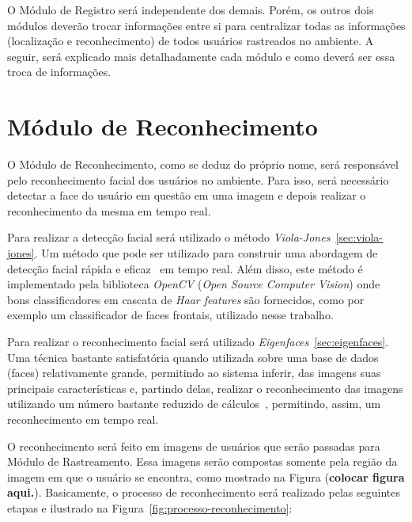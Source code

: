 
O Módulo de Registro será independente dos demais. Porém, os outros dois módulos deverão trocar informações entre si para centralizar todas as informações (localização e reconhecimento) de todos usuários rastreados no ambiente. A seguir, será explicado mais detalhadamente cada módulo e como deverá ser essa troca de informações.

\section{Módulo de Reconhecimento}

	O Módulo de Reconhecimento, como se deduz do próprio nome, será responsável pelo reconhecimento facial dos usuários no ambiente. Para isso, será necessário detectar a face do usuário em questão em uma imagem e depois realizar o reconhecimento da mesma em tempo real. 

	Para realizar a detecção facial será utilizado o método \textit{Viola-Jones}~\ref{sec:viola-jones}. Um método que pode ser utilizado para construir uma abordagem de detecção facial rápida e eficaz~\cite{violajones} em tempo real. Além disso, este método é implementado pela biblioteca \textit{OpenCV} (\textit{Open Source Computer Vision}) onde bons classificadores em cascata de \textit{Haar features} são fornecidos, como por exemplo um classificador de faces frontais, utilizado nesse trabalho.

	Para realizar o reconhecimento facial será utilizado \textit{Eigenfaces}~\ref{sec:eigenfaces}. Uma técnica bastante satisfatória quando utilizada sobre uma base de dados (faces) relativamente grande, permitindo ao sistema inferir, das imagens suas principais características e, partindo delas, realizar o reconhecimento das imagens utilizando um número bastante reduzido de cálculos~\cite{artigo-eigenface}, permitindo, assim, um reconhecimento em tempo real.

	O reconhecimento será feito em imagens de usuários que serão passadas para Módulo de Rastreamento. Essa imagens serão compostas somente pela região da imagem em que o usuário se encontra, como mostrado na Figura (\textbf{colocar figura aqui.}). Basicamente, o processo de reconhecimento será realizado pelas seguintes etapas e ilustrado na Figura~\ref{fig:processo-reconhecimento}:

